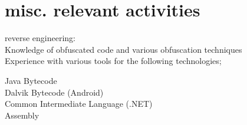 \documentclass[]{friggeri-cv}
\begin{document}
\section{misc. relevant activities}
reverse engineering:\\
  Knowledge of obfuscated code and various obfuscation techniques\\
    Experience with various tools for the following technologies;
    \begin{multicols}{2}
    Java Bytecode \\
    Dalvik Bytecode (Android) \\
    Common Intermediate Language (.NET) \\
    Assembly
    \end{multicols}
\end{document}
